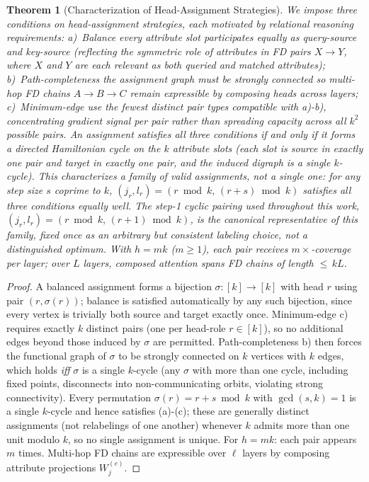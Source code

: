 \documentclass[review]{elsarticle}
\newtheorem{theorem}{Theorem}
\begin{document}
\begin{theorem}[Characterization of Head-Assignment Strategies]
	\label{prop:coverage}
We impose three conditions on head-assignment strategies, each motivated by relational reasoning requirements: {a)~Balance} every attribute slot participates equally as query-source and key-source (reflecting the symmetric role of attributes in FD pairs $X \to Y$, where $X$ and $Y$ are each relevant as both queried and matched attributes); {b)~Path-completeness} the assignment graph must be strongly connected so multi-hop FD chains $A \to B \to C$ remain expressible by composing heads across layers; {c)~Minimum-edge} use the fewest distinct pair types compatible with a)-b), concentrating gradient signal per pair rather than spreading capacity across all $k^2$ possible pairs. An assignment satisfies all three conditions \emph{if and only if} it forms a directed Hamiltonian cycle on the $k$ attribute slots (each slot is source in exactly one pair and target in exactly one pair, and the induced digraph is a single $k$-cycle). This characterizes a \emph{family} of valid assignments, not a single one: for any step size $s$ coprime to $k$, $(j_r, l_r) = (r \bmod k,\, (r{+}s) \bmod k)$ satisfies all three conditions equally well. The step-1 cyclic pairing used throughout this work, $(j_r, l_r) = (r \bmod k,\,(r{+}1) \bmod k)$, is the canonical representative of this family, fixed once as an arbitrary but consistent labeling choice, not a distinguished optimum. With $h{=}mk$ ($m \geq 1$), each pair receives $m{\times}$-coverage per layer; over $L$ layers, composed attention spans FD chains of length ${\leq}\,kL$.
\end{theorem}

\begin{proof}
	\renewcommand{\qedsymbol}{}
A balanced assignment forms a bijection $\sigma\colon [k]\!\to\![k]$ with head $r$ using pair $(r,\sigma(r))$; balance is satisfied automatically by any such bijection, since every vertex is trivially both source and target exactly once. Minimum-edge c) requires exactly $k$ distinct pairs (one per head-role $r \in [k]$), so no additional edges beyond those induced by $\sigma$ are permitted. Path-completeness b) then forces the functional graph of $\sigma$ to be strongly connected on $k$ vertices with $k$ edges, which holds \emph{iff} $\sigma$ is a single $k$-cycle (any $\sigma$ with more than one cycle, including fixed points, disconnects into non-communicating orbits, violating strong connectivity). Every permutation $\sigma(r) = r + s \bmod k$ with $\gcd(s,k)=1$ is a single $k$-cycle and hence satisfies (a)-(c); these are generally distinct assignments (not relabelings of one another) whenever $k$ admits more than one unit modulo $k$, so no single assignment is unique. For $h{=}mk$: each pair appears $m$ times. Multi-hop FD chains are expressible over $\ell$ layers by composing attribute projections $W_j^{(e)}$.
\end{proof}
\end{document}

